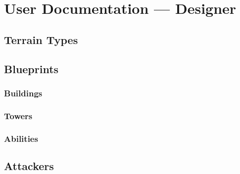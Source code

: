 \chapter{User Documentation --- Designer}

\section{Terrain Types}

\section{Blueprints}

\subsection{Buildings}

\subsection{Towers}

\subsection{Abilities}

\section{Attackers}

